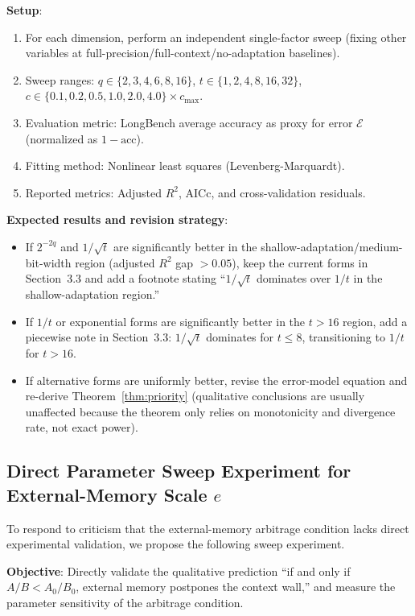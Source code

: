 \documentclass[11pt,a4paper]{article}
\theoremstyle{plain}
\theoremstyle{definition}
\begin{document}
\textbf{Setup}:
\begin{enumerate}
    \item For each dimension, perform an independent single-factor sweep (fixing other variables at full-precision/full-context/no-adaptation baselines).
    \item Sweep ranges: $q \in \{2,3,4,6,8,16\}$, $t \in \{1,2,4,8,16,32\}$, $c \in \{0.1, 0.2, 0.5, 1.0, 2.0, 4.0\} \times c_{\max}$.
    \item Evaluation metric: LongBench average accuracy as proxy for error $\mathcal{E}$ (normalized as $1 - \text{acc}$).
    \item Fitting method: Nonlinear least squares (Levenberg-Marquardt).
    \item Reported metrics: Adjusted $R^2$, AICc, and cross-validation residuals.
\end{enumerate}

\textbf{Expected results and revision strategy}:
\begin{itemize}
    \item If $2^{-2q}$ and $1/\sqrt{t}$ are significantly better in the shallow-adaptation/medium-bit-width region (adjusted $R^2$ gap $>0.05$), keep the current forms in Section~3.3 and add a footnote stating ``$1/\sqrt{t}$ dominates over $1/t$ in the shallow-adaptation region.''
    \item If $1/t$ or exponential forms are significantly better in the $t > 16$ region, add a piecewise note in Section~3.3: $1/\sqrt{t}$ dominates for $t \leq 8$, transitioning to $1/t$ for $t > 16$.
    \item If alternative forms are uniformly better, revise the error-model equation and re-derive Theorem~\ref{thm:priority} (qualitative conclusions are usually unaffected because the theorem only relies on monotonicity and divergence rate, not exact power).
\end{itemize}

\subsection{Direct Parameter Sweep Experiment for External-Memory Scale $e$}\label{app:esweep}

To respond to criticism that the external-memory arbitrage condition lacks direct experimental validation, we propose the following sweep experiment.

\textbf{Objective}: Directly validate the qualitative prediction ``if and only if $A/B < A_0/B_0$, external memory postpones the context wall,'' and measure the parameter sensitivity of the arbitrage condition.
\end{document}
